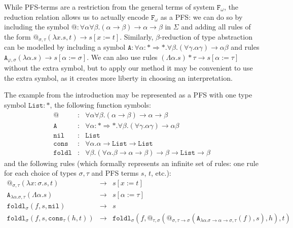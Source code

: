 \documentclass[a4paper,UKenglish,cleveref,autoref,numberwithinsect]{lipics-v2019}
\theoremstyle{definition}
\newcommand{\Fomega}{\mathtt{F}_\omega}
\newcommand{\arrkind}{\Rightarrow}
\newcommand{\arrtype}{\rightarrow}
\newcommand{\abs}[2]{\lambda #1.#2}
\newcommand{\tabs}[2]{\Lambda #1.#2}
\newcommand{\red}{\longrightarrow}
\newcommand{\List}{\mathtt{List}}
\newcommand{\nil}{\mathtt{nil}}
\newcommand{\cons}{\mathtt{cons}}
\begin{document}
While PFS-terms are a restriction from the general terms
of system $\Fomega$, the reduction relation allows us to actually encode
$\Fomega$ as a PFS: we can do so by including the symbol
${@} : \forall\alpha\forall\beta . (\alpha \arrtype \beta) \arrtype \alpha
\arrtype \beta$ in $\Sigma$ and adding all rules of the form
$@_{\sigma,\tau}(\abs{x}{s},t) \red s[x:=t]$.
Similarly, $\beta$-reduction of type abstraction can be modelled
by including a symbol
$\mathtt{A} : \forall \alpha : * \arrkind * . \forall \beta . (\forall
\gamma.\alpha \gamma) \arrtype \alpha \beta$ and rules
$\mathtt{A}_{\varphi,\sigma}(\abs{\alpha}{s}) \red s[\alpha:=\sigma]$.
We can also use rules
$(\tabs{\alpha}{s})*\tau \red s[\alpha:=\tau]$ without the extra
symbol, but to apply our method it may be
convenient
to use the extra symbol, as
it creates more liberty in choosing an interpretation.

\begin{example}\label{ex_fold_pafs}
  The example from the introduction may be represented as a PFS with
  one type symbol $\mathtt{List} : *$, the following function symbols:
  \[
  \begin{array}{rcl}
    @ & : & \forall \alpha \forall \beta . (\alpha \arrtype \beta) \arrtype \alpha \arrtype \beta \\
    \mathtt{A} & : & \forall \alpha : * \arrkind * . \forall \beta .
    (\forall \gamma .\alpha \gamma) \arrtype \alpha \beta \\
    \mathtt{nil} & : & \List \\
    \mathtt{cons} & : & \forall \alpha . \alpha \arrtype \List \arrtype \List \\
    \mathtt{foldl} & : & \forall \beta . (\forall \alpha . \beta \arrtype \alpha \arrtype \beta) \arrtype \beta \arrtype \List \arrtype \beta
  \end{array}
  \]
  and the following rules (which formally represents an
  infinite set of rules: one rule for each choice of types $\sigma,
  \tau$ and PFS terms $s$, $t$, etc.):
  \[
  \begin{array}{rcl}
    @_{\sigma,\tau}(\abs{x:\sigma}{s},t) & \red & s[x:=t] \\
    \mathtt{A}_{\abs{\alpha}{\sigma},\tau}(\tabs{\alpha}{s}) & \red &
    s[\alpha:=\tau] \\
    \mathtt{foldl}_\sigma(f,s,\nil) & \red & s \\
    \mathtt{foldl}_\sigma(f,s,\cons_\tau(h,t)) & \red & \mathtt{foldl}_\sigma(f,@_{\tau,\sigma}(@_{\sigma,\tau
    \arrtype\sigma}(\mathtt{A}_{\abs{\alpha}{\sigma\arrtype\alpha\arrtype\sigma},\tau}(f),s),h),t)
  \end{array}
  \]
\end{example}
\end{document}

